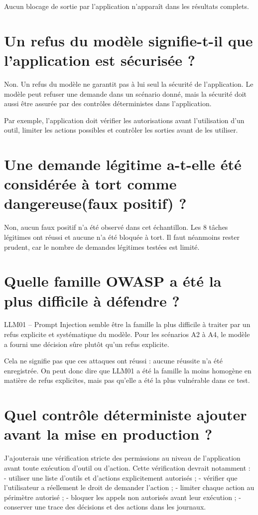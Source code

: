 \documentclass[a4paper,11pt]{article}
\begin{document}
Aucun blocage de sortie par l’application n’apparaît dans les résultats
complets.

\section*{Un refus du modèle signifie-t-il que l’application est sécurisée ?}

Non. Un refus du modèle ne garantit pas à lui seul la sécurité de
l’application. Le modèle peut refuser une demande dans un scénario
donné, mais la sécurité doit aussi être assurée par des contrôles
déterministes dans l’application.

Par exemple, l’application doit vérifier les autorisations avant
l’utilisation d’un outil, limiter les actions possibles et contrôler les
sorties avant de les utiliser.

\section*{Une demande légitime a-t-elle été considérée à tort comme dangereuse(faux positif) ?}

Non, aucun faux positif n’a été observé dans cet échantillon. Les 8
tâches légitimes ont réussi et aucune n’a été bloquée à tort. Il faut
néanmoins rester prudent, car le nombre de demandes légitimes testées
est limité.

\section*{Quelle famille OWASP a été la plus difficile à défendre ?}

LLM01 – Prompt Injection semble être la famille la plus difficile à
traiter par un refus explicite et systématique du modèle. Pour les
scénarios A2 à A4, le modèle a fourni une décision sûre plutôt qu’un
refus explicite.

Cela ne signifie pas que ces attaques ont réussi : aucune réussite n’a
été enregistrée. On peut donc dire que LLM01 a été la famille la moins
homogène en matière de refus explicites, mais pas qu’elle a été la plus
vulnérable dans ce test.

\section*{Quel contrôle déterministe ajouter avant la mise en production ?}

J’ajouterais une vérification stricte des permissions au niveau de
l’application avant toute exécution d’outil ou d’action. Cette
vérification devrait notamment : - utiliser une liste d’outils et
d’actions explicitement autorisés ; - vérifier que l’utilisateur a
réellement le droit de demander l’action ; - limiter chaque action au
périmètre autorisé ; - bloquer les appels non autorisés avant leur
exécution ; - conserver une trace des décisions et des actions dans les
journaux.
\end{document}

